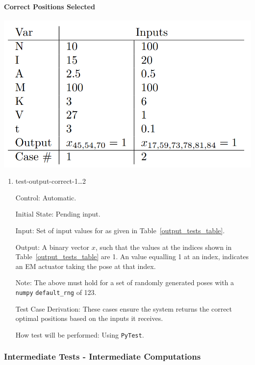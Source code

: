 \documentclass[12pt, titlepage]{article}
\begin{document}
\paragraph{Correct Positions Selected}
\begin{center}
  \includegraphics[scale=0.4]{OutputTable.PNG} \\
  \label{output_tests_table}
\end{center}

\begin{enumerate}

  \item{test-output-correct-1\dots2\\}
  
  Control: Automatic.
            
  Initial State: Pending input.
            
  Input: Set of input values for as given in Table~\ref{output_tests_table}.
            
  Output: A binary vector $x$, such that the values at the indices shown in Table~\ref{output_tests_table} are 1. An value equalling 1 at an index, indicates an EM actuator taking the pose at that index.

  Note: The above must hold for a set of randomly generated poses with a \texttt{numpy} \texttt{default\_rng} of 123. 
  
  Test Case Derivation: These cases ensure the system returns the correct optimal positions based on the inputs it receives. 
            
  How test will be performed: Using \texttt{PyTest}. 
\end{enumerate}

\subsubsection{Intermediate Tests - Intermediate Computations} \label{svd_test}
\end{document}
